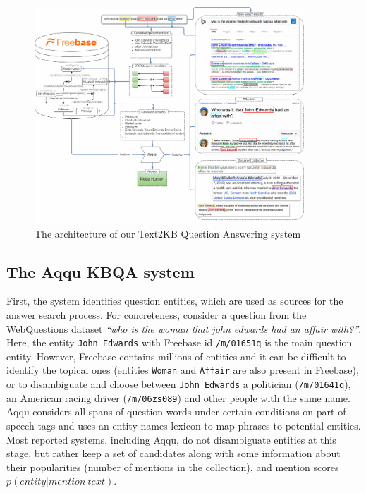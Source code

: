\begin{figure}[!ht]
\centering
\includegraphics[width=0.9\textwidth]{img/Text2KB_model}
\vspace{-4mm}
\caption{The architecture of our Text2KB Question Answering system}
\label{fig:model}
\vspace{-3mm}
\end{figure}


\subsection{The Aqqu KBQA system}
\label{sec:baseline:aqqu}

First, the system identifies question entities, which are used as sources for the answer search process.
For concreteness, consider a question from the WebQuestions dataset \textit{``who is the woman that john edwards had an affair with?''}.
Here, the entity \texttt{John Edwards} with Freebase id \texttt{/m/01651q} is the main question entity.
However, Freebase contains millions of entities and it can be difficult to identify the topical ones (\eg entities \texttt{Woman} and \texttt{Affair} are also present in Freebase), or to disambiguate and choose between \texttt{John Edwards} a politician (\texttt{/m/01641q}), an American racing driver (\texttt{/m/06zs089}) and other people with the same name.
Aqqu considers all spans of question words under certain conditions on part of speech tags and uses an entity names lexicon \cite{SPITKOVSKY12.266} to map phrases to potential entities.
Most reported systems, including Aqqu, do not disambiguate entities at this stage, but rather keep a set of candidates along with some information about their popularities (\eg number of mentions in the collection), and mention scores $p(entity| mention\ text)$.

